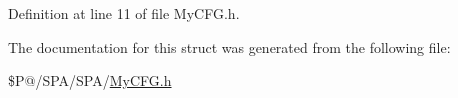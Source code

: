 Definition at line 11 of file My\-C\-F\-G.\-h.



The documentation for this struct was generated from the following file\-:\begin{DoxyCompactItemize}
\item 
\$\-P@/\-S\-P\-A/\-S\-P\-A/\hyperlink{_my_c_f_g_8h}{My\-C\-F\-G.\-h}\end{DoxyCompactItemize}
